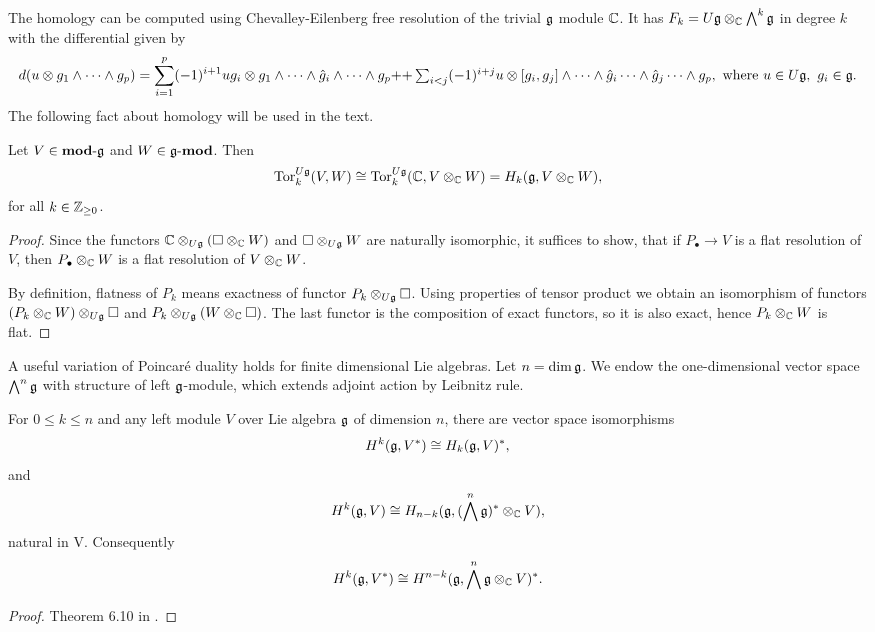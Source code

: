 The homology can be computed using Chevalley-Eilenberg \cite{guichardet} free
resolution of the trivial $\mathfrak{g}$ module $\mathbb{C}$. It has $F_k=U\mathfrak{g}\otimes_{\mathbb{C}} \bigwedge^k
\mathfrak{g}$ in degree $k$ with the differential given by
\begin{equation}
    d(u\otimes g_1 \wedge \cdots \wedge g_p) 
 = \sum_{i = 1}^p (-1)^{i+1} u g_i \otimes g_1 \wedge \cdots \wedge \hat{g}_i\wedge \cdots \wedge g_p  
+$$ $$+\sum_{i < j} (-1)^{i+j} u\otimes [g_i, g_j] \wedge \cdots \wedge \hat{g}_i\cdots \wedge
\hat{g}_j\cdots \wedge g_p,~\text{where } u\in U\lieg,~g_i \in \lieg.
\end{equation}
The following fact about homology will be used in the text.
\begin{lemma} \label{t:torhomology}
   Let $V \in \operatorname{\mathbf{mod-\mathfrak{g}}}$ and $W \in \operatorname{\mathbf{\mathfrak{g}-mod}}$. Then  
    \[
        \mathrm{Tor}_k^{U\mathfrak{g}}(V,W) \cong \mathrm{Tor}_k^{U\mathfrak{g}}(\mathbb{C},V\otimes_{\mathbb{C}} W) = H_k(\mathfrak{g}, V\otimes_{\mathbb{C}} W),
    \]
    for all $k\in \mathbb{Z}_{\geq 0}$.
\end{lemma}
\begin{proof}
    Since the functors $\mathbb{C}\otimes_{U\mathfrak{g}}(\square \otimes_{\mathbb{C}} W)$ and $\square \otimes_{U\mathfrak{g}} W$
    are naturally isomorphic, it suffices to show, that if $P_\bullet \to V$ is a flat resolution
    of $V$, then $P_\bullet \otimes_{\mathbb{C}} W$ is a flat resolution of $V\otimes_{\mathbb{C}} W$.

    By definition, flatness of $P_k$ means exactness of functor $P_k\otimes_{U\mathfrak{g}}\square$. Using
    properties of tensor product we obtain an isomorphism of functors $(P_k\otimes_{\mathbb{C}} W)
    \otimes_{U\mathfrak{g}} \square$ and $P_k\otimes_{U\mathfrak{g}} (W \otimes_{\mathbb{C}} \square)$. The last functor
    is the composition of exact functors, so it is also exact, hence $P_k\otimes_{\mathbb{C}} W$ is flat.
\end{proof}

A useful variation of Poincar\'e duality holds for finite dimensional Lie algebras. Let $n = \dim
\mathfrak{g}$. We endow the one-dimensional vector space $\bigwedge^n \mathfrak{g}$ with structure of left
$\mathfrak{g}$-module, which extends adjoint action by Leibnitz rule. 

\begin{theorem} \label{t:poincare}
    For $0 \leq k \leq n$ and any left module $V$ over Lie algebra $\mathfrak{g}$ of dimension $n$, there
    are vector space isomorphisms 
    \[
        H^k(\mathfrak{g}, V^*) \cong H_k(\mathfrak{g}, V)^*,
    \]
    and
    \[
        H^k(\mathfrak{g}, V) \cong H_{n - k}(\mathfrak{g}, (\bigwedge^n \mathfrak{g})^*\otimes_{\mathbb{C}} V),
    \]
    natural in V. Consequently
    \[
        H^k(\mathfrak{g}, V^*) \cong H^{n - k}(\mathfrak{g},  \bigwedge^n \mathfrak{g}\otimes_{\mathbb{C}} V)^*. 
    \]
\end{theorem}
\begin{proof}
    Theorem 6.10 in \cite{knapp}.
\end{proof}
